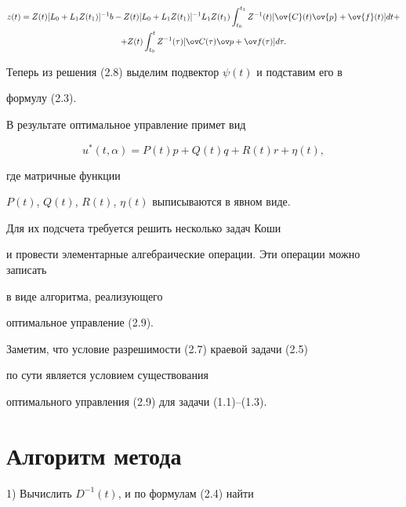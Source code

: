 \begin{multline}


z(t)=Z(t)[L_{0}+L_{1}Z(t_{1})]^{-1}b-


Z(t)[L_{0}+L_{1}Z(t_{1})]^{-1}L_{1}


Z(t_{1})\int_{t_{0}}^{t_{1}} Z^{-1}(t)[\ov {C}(t)\ov {p}+\ov {f}(t)]dt+\\


%


+Z(t)\int_{t_0}^t Z^{-1}(\tau)[\ov C(\tau)\ov p+\ov f(\tau )]d\tau.


\end{multline}


Теперь из решения (2.8) выделим подвектор $\psi(t)$ и подставим его в 


формулу (2.3).


В результате оптимальное управление примет вид


\begin{equation}


u^{\ast }(t,\alpha)=P(t)p+Q(t)q+R(t)r+\eta (t),


\end{equation}


где матричные функции 


$P(t)$, $Q(t)$, $R(t)$, $\eta(t)$ выписываются в явном виде.


Для их подсчета требуется решить несколько задач Коши 


и провести элементарные алгебраические операции. Эти операции можно записать 


в виде алгоритма, реализующего 


оптимальное управление (2.9).





Заметим, что условие разрешимости (2.7) краевой задачи (2.5) 


по сути является условием существования 


оптимального управления (2.9) для задачи (1.1)--(1.3).





\section{Алгоритм метода}





\noindent


1) Вычислить $D^{-1}(t)$, и по формулам (2.4) найти


